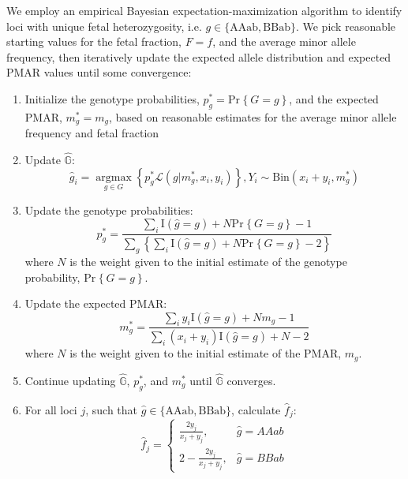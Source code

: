 \documentclass{article}\usepackage[]{graphicx}\usepackage[]{color}
\newcommand{\pr}[2][]{\text{Pr}_{#1}\left\{#2\right\}}
\newcommand\I[1]{\text{I}\left(#1\right)}
\begin{document}
We employ an empirical Bayesian expectation-maximization algorithm to identify loci with unique fetal heterozygosity, i.e. $g \in \{\text{AAab}, \text{BBab}\}$.
We pick reasonable starting values for the fetal fraction, $F = f$, and the average minor allele frequency, then iteratively update the expected allele distribution and expected PMAR values until some convergence:

\begin{enumerate}

  \item Initialize the genotype probabilities, $p_g^* = \pr{G = g}$, and the expected PMAR, $m_g^* = m_g$, based on reasonable estimates for the average minor allele frequency and fetal fraction

  \item Update $\hat{\mathbb{G}}$:
  \begin{equation}
    \hat{g}_i = \mathop{\text{argmax}}\limits_{g \in G}\left\{p_g^*\mathcal{L}(g \rvert m_g^*,x_i,y_i)\right\}, Y_{i} \sim \text{Bin}(x_i + y_i, m_g^*)
  \end{equation}

  \item Update the genotype probabilities:
  \begin{equation}
    p_g^* = \frac{\sum_i \I{\hat{g} = g} + N\pr{G = g} - 1}{\sum_g\left\{\sum_i \I{\hat{g} = g} + N\pr{G = g} - 2\right\}}
  \end{equation}
  where $N$ is the weight given to the initial estimate of the genotype probability, $\pr{G = g}$.

  \item Update the expected PMAR:
  \begin{equation}
    m_g^* = \frac{\sum_i y_i\I{\hat{g} = g} + Nm_g - 1}{\sum_i(x_i + y_i)\I{\hat{g} = g} + N - 2}
  \end{equation}
  where $N$ is the weight given to the initial estimate of the PMAR, $m_g$.

  \item Continue updating $\hat{\mathbb{G}}$, $p_g^*$, and $m_g^*$ until $\hat{\mathbb{G}}$ converges.

  \item For all loci $j$, such that $\hat{g} \in \{\text{AAab}, \text{BBab}\}$, calculate $\hat{f}_j$:
  \begin{equation}
    \hat{f}_j =
      \begin{cases}
        \displaystyle\frac{2y_j}{x_j + y_j}, & \hat{g} = AAab \\[15pt]
        2 - \displaystyle\frac{2y_j}{x_j + y_j}, & \hat{g} = BBab
      \end{cases}
  \end{equation}


\end{enumerate}
\end{document}
